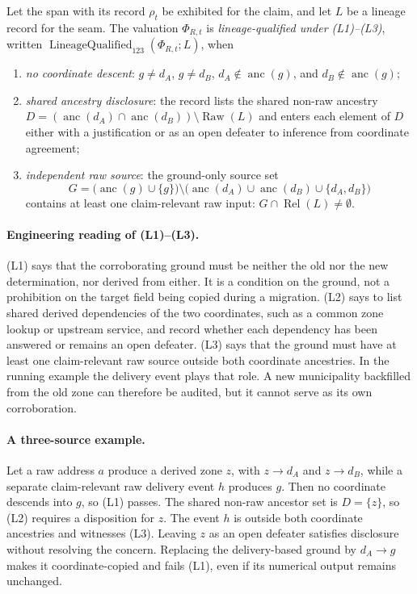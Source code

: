 \documentclass[smallextended,envcountsect,envcountsame,natbib]{svjour3}
\begin{document}
\begin{definition}\label{ex:def:lineage-qualified-three}
Let the span with its record $\rho_t$ be exhibited for the claim, and let $L$ be a lineage record for the seam. The valuation $\Phi_{R,t}$ is \emph{lineage-qualified under (L1)--(L3)}, written $\operatorname{LineageQualified}_{123}(\Phi_{R,t};L)$, when
\begin{enumerate}
\item[(L1)] \emph{no coordinate descent}: $g\neq d_A$, $g\neq d_B$, $d_A\notin\operatorname{anc}(g)$, and $d_B\notin\operatorname{anc}(g)$;
\item[(L2)] \emph{shared ancestry disclosure}: the record lists the shared non-raw ancestry $D=(\operatorname{anc}(d_A)\cap\operatorname{anc}(d_B))\setminus\operatorname{Raw}(L)$ and enters each element of $D$ either with a justification or as an open defeater to inference from coordinate agreement;
\item[(L3)] \emph{independent raw source}: the ground-only source set
\[
G=\bigl(\operatorname{anc}(g)\cup\{g\}\bigr)\setminus
\bigl(\operatorname{anc}(d_A)\cup\operatorname{anc}(d_B)\cup\{d_A,d_B\}\bigr)
\]
contains at least one claim-relevant raw input: $G\cap\operatorname{Rel}(L)\neq\emptyset$.
\end{enumerate}
\end{definition}

\paragraph{Engineering reading of (L1)--(L3).} (L1) says that the corroborating ground must be neither the old nor the new determination, nor derived from either. It is a condition on the ground, not a prohibition on the target field being copied during a migration. (L2) says to list shared derived dependencies of the two coordinates, such as a common zone lookup or upstream service, and record whether each dependency has been answered or remains an open defeater. (L3) says that the ground must have at least one claim-relevant raw source outside both coordinate ancestries. In the running example the delivery event plays that role. A new municipality backfilled from the old zone can therefore be audited, but it cannot serve as its own corroboration.

\paragraph{A three-source example.} Let a raw address $a$ produce a derived zone $z$, with $z\to d_A$ and $z\to d_B$, while a separate claim-relevant raw delivery event $h$ produces $g$. Then no coordinate descends into $g$, so (L1) passes. The shared non-raw ancestor set is $D=\{z\}$, so (L2) requires a disposition for $z$. The event $h$ is outside both coordinate ancestries and witnesses (L3). Leaving $z$ as an open defeater satisfies disclosure without resolving the concern. Replacing the delivery-based ground by $d_A\to g$ makes it coordinate-copied and fails (L1), even if its numerical output remains unchanged.
\end{document}
